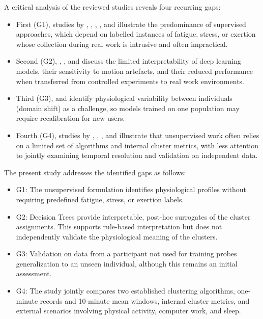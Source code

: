 \documentclass[a4paper,fleqn]{cas-sc}
\newcommand{\newtextgreen}[1]{{\color{green!60!black}#1}}
\begin{document}
\newtextgreen{A critical analysis of the reviewed studies reveals four recurring gaps:}
\begin{itemize}
\item \newtextgreen{First (G1), studies by \citet{fasoyinu2025}, \citet{wang2024}, \citet{umer2025}, \citet{karim2025}, and \citet{albarran2025} illustrate the predominance of supervised approaches, which depend on labelled instances of fatigue, stress, or exertion whose collection during real work is intrusive and often impractical.}
\item \newtextgreen{Second (G2), \citet{kakhi2025}, \citet{ojha2024}, and \citet{cheng2025} discuss the limited interpretability of deep learning models, their sensitivity to motion artefacts, and their reduced performance when transferred from controlled experiments to real work environments.}
\item \newtextgreen{Third (G3), \citet{anjum2025} and \citet{ojha2024} identify physiological variability between individuals (domain shift) as a challenge, so models trained on one population may require recalibration for new users.}
\item \newtextgreen{Fourth (G4), studies by \citet{georgiev2026}, \citet{georgieva2025}, \citet{messaoud2025}, and \citet{arifin2025} illustrate that unsupervised work often relies on a limited set of algorithms and internal cluster metrics, with less attention to jointly examining temporal resolution and validation on independent data.}
\end{itemize}

\newtextgreen{The present study addresses the identified gaps as follows:}
\begin{itemize}
\item \newtextgreen{G1: The unsupervised formulation identifies physiological profiles without requiring predefined fatigue, stress, or exertion labels.}
\item \newtextgreen{G2: Decision Trees provide interpretable, post-hoc surrogates of the cluster assignments. This supports rule-based interpretation but does not independently validate the physiological meaning of the clusters.}
\item \newtextgreen{G3: Validation on data from a participant not used for training probes generalization to an unseen individual, although this remains an initial assessment.}
\item \newtextgreen{G4: The study jointly compares two established clustering algorithms, one-minute records and 10-minute mean windows, internal cluster metrics, and external scenarios involving physical activity, computer work, and sleep.}
\end{itemize}
\end{document}
